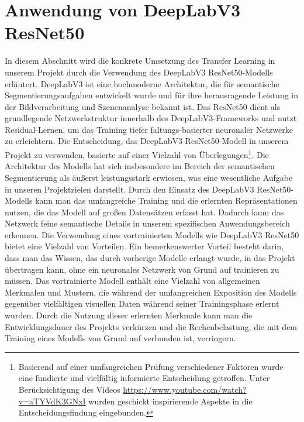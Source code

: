 \section{Anwendung von DeepLabV3 ResNet50}

    In diesem Abschnitt wird die konkrete Umsetzung des Transfer Learning in unserem Projekt durch die Verwendung des DeepLabV3 ResNet50-Modells erläutert.
    DeepLabV3 ist eine hochmoderne Architektur, die für semantische Segmentierungsaufgaben entwickelt wurde und für ihre herausragende Leistung in der Bildverarbeitung und Szenenanalyse bekannt ist.
    Das ResNet50 dient als grundlegende Netzwerkstruktur innerhalb des DeepLabV3-Frameworks und nutzt Residual-Lernen, um das Training tiefer faltungs-basierter neuronaler Netzwerke zu erleichtern.
    Die Entscheidung, das DeepLabV3 ResNet50-Modell in unserem Projekt zu verwenden, basierte auf einer Vielzahl von Überlegungen\footnote{Basierend auf einer umfangreichen Prüfung verschiedener Faktoren wurde eine fundierte und vielfältig informierte Entscheidung getroffen. Unter Berücksichtigung des Videos \url{https://www.youtube.com/watch?v=aTYVdK3GNxI} wurden geschickt inspirierende Aspekte in die Entscheidungsfindung eingebunden.}.
    Die Architektur des Modells hat sich insbesondere im Bereich der semantischen Segmentierung als äußerst leistungsstark erwiesen, was eine wesentliche Aufgabe in unseren Projektzielen darstellt.
    Durch den Einsatz des DeepLabV3 ResNet50-Modells kann man das umfangreiche Training und die erlernten Repräsentationen nutzen, die das Modell auf großen Datensätzen erfasst hat.
    Dadurch kann das Netzwerk feine semantische Details in unserem spezifischen Anwendungsbereich erkennen.
    Die Verwendung eines vortrainierten Modells wie DeepLabV3 ResNet50 bietet eine Vielzahl von Vorteilen.
    Ein bemerkenswerter Vorteil besteht darin, dass man das Wissen, das durch vorherige Modelle erlangt wurde, in das Projekt übertragen kann, ohne ein neuronales Netzwerk von Grund auf trainieren zu müssen.
    Das vortrainierte Modell enthält eine Vielzahl von allgemeinen Merkmalen und Mustern, die während der umfangreichen Exposition des Modells gegenüber vielfältigen visuellen Daten während seiner Trainingsphase erlernt wurden.
    Durch die Nutzung dieser erlernten Merkmale kann man die Entwicklungsdauer des Projekts verkürzen und die Rechenbelastung, die mit dem Training eines Modells von Grund auf verbunden ist, verringern.
    
